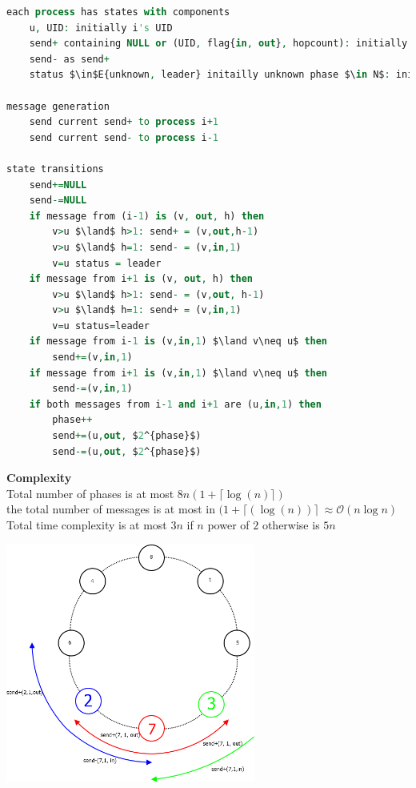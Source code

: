 \begin{lstlisting}[mathescape, language=VHDL]
each process has states with components
	u, UID: initially i's UID
	send+ containing NULL or (UID, flag{in, out}, hopcount): initially (i's UID, out, 1)
	send- as send+
	status $\in$E{unknown, leader} initailly unknown phase $\in N$: initially 0

message generation
	send current send+ to process i+1
	send current send- to process i-1

state transitions
	send+=NULL
	send-=NULL
	if message from (i-1) is (v, out, h) then
		v>u $\land$ h>1: send+ = (v,out,h-1)
		v>u $\land$ h=1: send- = (v,in,1)
		v=u status = leader
	if message from i+1 is (v, out, h) then
		v>u $\land$ h>1: send- = (v,out, h-1)
		v>u $\land$ h=1: send+ = (v,in,1)
		v=u status=leader
	if message from i-1 is (v,in,1) $\land v\neq u$ then
		send+=(v,in,1)
	if message from i+1 is (v,in,1) $\land v\neq u$ then
		send-=(v,in,1)
	if both messages from i-1 and i+1 are (u,in,1) then
		phase++
		send+=(u,out, $2^{phase}$)
		send-=(u,out, $2^{phase}$)
\end{lstlisting}
\textbf{Complexity}\\
Total number of phases is at most $8n(1+\lceil\log(n)\rceil)$\\
the total number of messages is at most in $(1+\lceil(\log(n))\rceil\ \approx \mathcal{O}(n\log n)$\\
Total time complexity is at most $3n$ if $n$ power of $2$ otherwise is $5n$\\

\begin{minipage}{\linewidth}
	\centering\includegraphics[width=310px]{gfx/HS_p1.png}
	\label{img:hs_p1}
\end{minipage}

